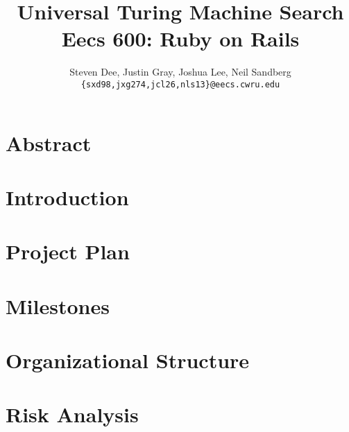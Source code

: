 \documentclass{article}
\title{Universal Turing Machine Search\\
\Large {\sc Eecs} 600: Ruby on Rails}
\author{Steven Dee, Justin Gray, Joshua Lee, Neil Sandberg \\
\tt \{sxd98,jxg274,jcl26,nls13\}@eecs.cwru.edu}
\begin{document}
\maketitle

\section{Abstract}



\section{Introduction}



\section{Project Plan}



\section{Milestones}



\section{Organizational Structure}



\section{Risk Analysis}





\end{document}
